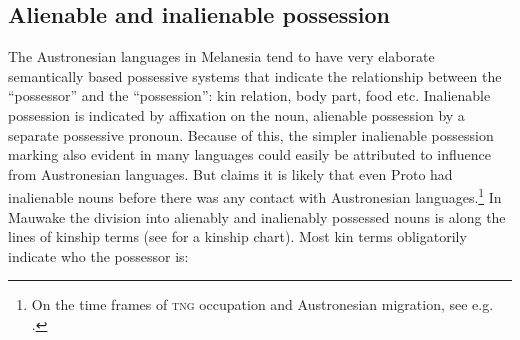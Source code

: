 \subsection{Alienable and inalienable possession}\label{sec:3.2.4}
{}
The Austronesian languages in Melanesia tend to have very elaborate semantically based possessive systems that indicate the relationship between the ``possessor'' and the ``possession'': kin relation, body part, food etc. Inalienable possession is indicated by affixation on the noun, alienable possession by a separate possessive pronoun. Because of this, the simpler inalienable possession marking also evident in many  languages could easily be attributed to influence from Austronesian languages. But \citet[28]{Ross1996} claims it is likely that even Proto  had inalienable nouns before there was any contact with Austronesian languages.\footnote{On the time frames of \textsc{tng} occupation and Austronesian migration, see e.g. \citet[39--41]{Ross2005}.} In Mauwake the division into alienably and inalienably possessed nouns is along the lines of kinship terms (see  for a kinship chart). Most kin terms obligatorily indicate who the {\textquotedbl}possessor{\textquotedbl} is:

